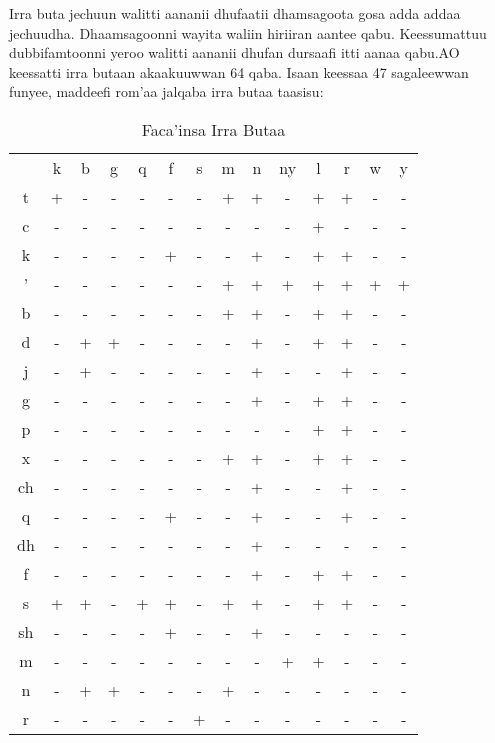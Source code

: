 \documentclass[11pt,b5paper]{book}
\begin{document}
Irra buta jechuun walitti aananii dhufaatii dhamsagoota gosa  adda addaa jechuudha. Dhaamsagoonni wayita waliin hiriiran  aantee qabu. Keessumattuu dubbifamtoonni yeroo walitti aananii dhufan dursaafi itti aanaa qabu.AO keessatti irra butaan akaakuuwwan 64 qaba. Isaan keessaa  47 sagaleewwan funyee, maddeefi rom’aa jalqaba irra butaa  taasisu\cite[p.20-21]{lloret1988gemination}:  
\begin{table}[H]
	\caption{Faca'insa Irra Butaa}
	\begin{tabular}{c c c c c c c c c c c c c c}
		\hline\hline
		& k & b & g & q & f & s & m & n & ny & l & r & w & y \\
		t & + & - & - & - & - & - & + & + & -  & + & + & - & -\\
		c & - & - & - & - & - & - & - & - & -  & + & - & - & -  \\
		k & - & - & - & - & + & - & - & + & -  & + & + & - & - \\
		' & - & - & - & - & - & - & + & + & +  & + & + & + & + \\
		b & - & - & - & - & - & - & + & + & -  & + & + & - & - \\
		d & - & + & + & - & - & - & - & + & -  & + & + & - & -  \\
		j & - & + & - & - & - & - & - & + & -  & - & + & - & -  \\
		g & - & - & - & - & - & - & - & + & -  & + & + & - & -  \\
		p & - & - & - & - & - & - & - & - & -  & + & + & - & -   \\
		x & - & - & - & - & - & - & + & + & -  & + & + & - & -  \\
		ch & - & - & - & - & - & - & - & + & - & - & + & - & -  \\
		q & - & - & - & - & + & - & - & + & -  & - & + & - & - \\
		dh & - & - & - & - & - & - & - & + & - & - & - & - & -   \\
		f & - & - & - & - & - & - & - & + & -  & + & + & - & -  \\
		s & + & + & - & + & + & - & + & + & -  & + & + & - & - \\
		sh & - & - & - & - & + & - & - & + & - & - & - & - & -   \\
		m & - & - & - & - & - & - & - & - & +  & + & - & - & -  \\
		n & - & + & + & - & - & - & + & - & -  & - & - & - & - \\
		r & - & - & - & - & - & + & - & - & -  & - & - & - & - \\
		\hline\hline  
	\end{tabular}
\end{table}
\end{document}
